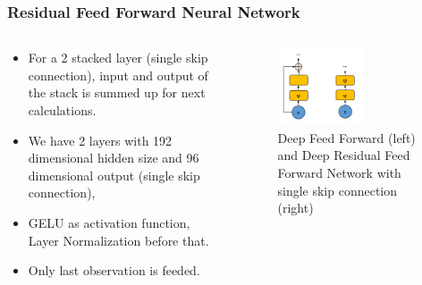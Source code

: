 \documentclass{beamer}
\begin{document}

\begin{frame}
\frametitle{Residual Feed Forward Neural Network}
\begin{columns}[onlytextwidth]
	\begin{column}{.49\textwidth}
		\begin{itemize}
			\item For a 2 stacked layer (single skip connection), input and output of the stack is summed up for next calculations. 
			\item We have 2 layers with 192 dimensional hidden size and 96 dimensional output (single skip connection), 
			\item GELU as activation function, Layer Normalization before that.
			\item Only last observation is feeded. 
		\end{itemize}
	\end{column}
	\begin{column}{.49\textwidth}
		\begin{figure}
			\centering
			\includegraphics[width=0.6\textwidth]{figures/ml_theory/rffnn_vs_ffnn.png}
			\caption{Deep Feed Forward (left) and Deep Residual Feed Forward Network with single skip connection (right)}
			\label{fig:rffnn_ffnn}
		\end{figure}
	\end{column}
\end{columns}
\end{frame}

\end{document}
